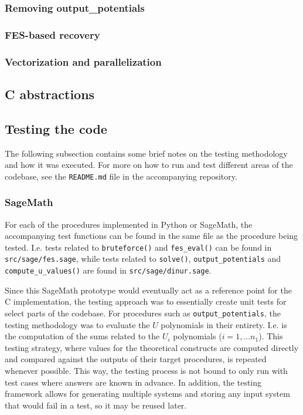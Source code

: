 \subsubsection{Removing output\_potentials}

\subsubsection{FES-based recovery} \label{sec:impl:opt:fes_rec}

\subsubsection{Vectorization and parallelization}

\subsection{C abstractions} \label{sec:impl:c_abstr}

\subsection{Testing the code}
The following subsection contains some brief notes on the testing methodology and how it was executed. For more on how to run and test different areas of the codebase, see the \texttt{README.md} file in the accompanying repository.

\subsubsection{SageMath}

For each of the procedures implemented in Python or SageMath, the accompanying test functions can be found in the same file as the procedure being tested. I.e. tests related to \texttt{bruteforce()} and \texttt{fes\_eval()} can be found in \texttt{src/sage/fes.sage}, while tests related to \texttt{solve()}, \texttt{output\_potentials} and \texttt{compute\_u\_values()} are found in \texttt{src/sage/dinur.sage}.

Since this SageMath prototype would eventually act as a reference point for the C implementation, the testing approach was to essentially create unit tests for select parts of the codebase. For procedures such as \texttt{output\_potentials}, the testing methodology was to evaluate the $U$ polynomials in their entirety. I.e.
is the computation of the sums related to the $U_i$ polynomials ($i = 1, \dots n_1$). This testing strategy, where values for the theoretical constructs are computed directly and compared against the outputs of their target procedures, is repeated whenever possible. This way, the testing process is not bound to only run with test cases where answers are known in advance. In addition, the testing framework allows for generating multiple systems and storing any input system that would fail in a test, so it may be reused later.

